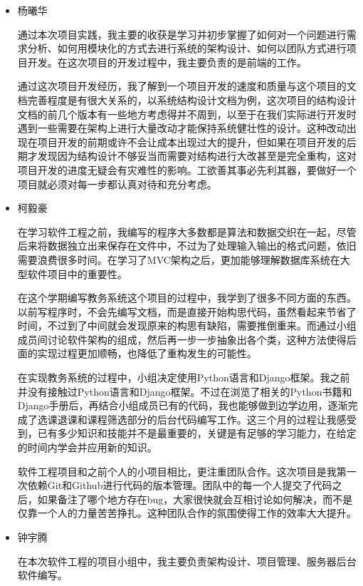 \begin{itemize}
  \item 杨曦华
  
  \CJKindent 通过本次项目实践，我主要的收获是学习并初步掌握了如何对一个问题进行需求分析、如何用模块化的方式去进行系统的架构设计、如何以团队方式进行项目开发。在这次项目的开发过程中，我主要负责的是前端的工作。
  
  \CJKindent 通过这次项目开发经历，我了解到一个项目开发的速度和质量与这个项目的文档完善程度是有很大关系的，以系统结构设计文档为例，这次项目的结构设计文档的前几个版本有一些地方考虑得并不周到，以至于在我们实际进行开发时遇到一些需要在架构上进行大量改动才能保持系统健壮性的设计。这种改动出现在项目开发的前期或许不会让成本出现过大的提升，但如果在项目开发的后期才发现因为结构设计不够妥当而需要对结构进行大改甚至是完全重构，这对项目开发的进度无疑会有灾难性的影响。工欲善其事必先利其器，要做好一个项目就必须对每一步都认真对待和充分考虑。
  
  \item 柯毅豪
  
  \CJKindent 在学习软件工程之前，我编写的程序大多数都是算法和数据交织在一起，尽管后来将数据独立出来保存在文件中，不过为了处理输入输出的格式问题，依旧需要浪费很多时间。在学习了MVC架构之后，更加能够理解数据库系统在大型软件项目中的重要性。
  
  \CJKindent 在这个学期编写教务系统这个项目的过程中，我学到了很多不同方面的东西。以前写程序时，不会先编写文档，而是直接开始构思代码，虽然看起来节省了时间，不过到了中间就会发现原来的构思有缺陷，需要推倒重来。而通过小组成员间讨论软件架构的组成，然后再一步一步抽象出各个类，这种方法使得后面的实现过程更加顺畅，也降低了重构发生的可能性。
  
  \CJKindent 在实现教务系统的过程中，小组决定使用Python语言和Django框架。我之前并没有接触过Python语言和Django框架。不过在浏览了相关的Python书籍和Django手册后，再结合小组成员已有的代码，我也能够做到边学边用，逐渐完成了选课退课和课程筛选部分的后台代码编写工作。这三个月的过程让我感受到，已有多少知识和技能并不是最重要的，关键是有足够的学习能力，在给定的时间内学会并应用新的知识。
  
  \CJKindent 软件工程项目和之前个人的小项目相比，更注重团队合作。这次项目是我第一次依赖Git和Github进行代码的版本管理。团队中的每一个人提交了代码之后，如果备注了哪个地方存在bug，大家很快就会互相讨论如何解决，而不是仅靠一个人的力量苦苦挣扎。这种团队合作的氛围使得工作的效率大大提升。
  
  \item 钟宇腾
  
  \CJKindent 在本次软件工程的项目小组中，我主要负责架构设计、项目管理、服务器后台软件编写。
  

\end{itemize}
